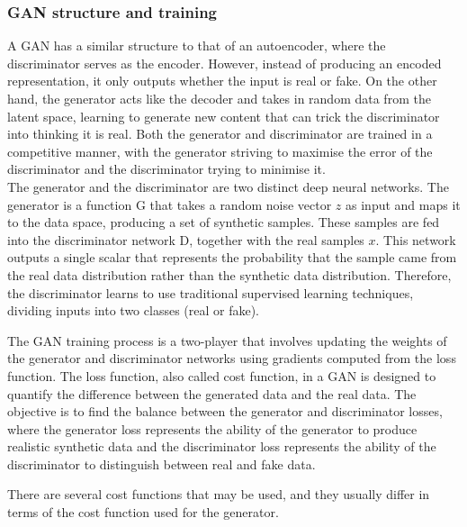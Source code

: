 \subsubsection{GAN structure and training}
\noindent A GAN has a similar structure to that of an autoencoder, where the discriminator serves as the encoder. However, instead of producing an encoded representation, it only outputs whether the input is real or fake. On the other hand, the generator acts like the decoder and takes in random data from the latent space, learning to generate new content that can trick the discriminator into thinking it is real. Both the generator and discriminator are trained in a competitive manner, with the generator striving to maximise the error of the discriminator and the discriminator trying to minimise it.\\

\noindent The generator and the discriminator are two distinct deep neural networks. The generator is a function G that takes a random noise vector $z$ as input and maps it to the data space, producing a set of synthetic samples. These samples are fed into the discriminator network D, together with the real samples $x$. This network outputs a single scalar that represents the probability that the sample came from the real data distribution rather than the synthetic data distribution. Therefore, the discriminator learns to use traditional supervised learning techniques, dividing inputs into two classes (real or fake).

\noindent The GAN training process is a two-player that involves updating the weights of the generator and discriminator networks using gradients computed from the loss function. The loss function, also called cost function, in a GAN is designed to quantify the difference between the generated data and the real data. The objective is to find the balance between the generator and discriminator losses, where the generator loss represents the ability of the generator to produce realistic synthetic data and the discriminator loss represents the ability of the discriminator to distinguish between real and fake data.

\noindent There are several cost functions that may be used, and they usually differ in terms of the cost function used for the generator.

